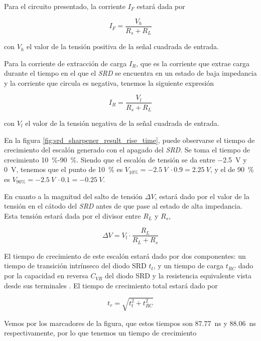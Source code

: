 Para el circuito presentado, la corriente $I_F$ estará dada por

\begin{equation}
    I_{F} = \frac{V_h}{R_s+R_L}
\end{equation}

con $V_h$ el valor de la tensión positiva de la señal cuadrada de entrada.

Para la corriente de extracción de carga $I_R$, que es la corriente que extrae
carga durante el tiempo en el que el \textit{SRD} se encuentra en un estado de
baja impedancia y la corriente que circula es negativa, tenemos la siguiente
expresión

\begin{equation}
    I_{R} = \frac{V_l}{R_s+R_L}
\end{equation}

con $V_l$ el valor de la tensión negativa de la señal cuadrada de entrada.

En la figura \ref{fig:srd_sharpener_result_rise_time}, puede observarse el
tiempo de crecimiento del escalón generado con el apagado del \textit{SRD}. Se
toma el tiempo de crecimiento \qty{10}{\percent}-\qty{90}{\percent}. Siendo que
el escalón de tensión se da entre \qty{-2.5}{\volt} y \qty{0}{\volt}, tenemos
que el punto de \qty{10}{\percent} es $V_{10\%} = -2.5 \ V \ \cdot 0.9 =  2.25 \
V$, y el de \qty{90}{\percent} es $V_{90\%} = -2.5 \ V \ \cdot 0.1 =  -0.25 \
V$.

En cuanto a la magnitud del salto de tensión $\Delta V$, estará dado por el
valor de la tensión en el cátodo del \textit{SRD} antes de que pase al estado de
alta impedancia. Esta tensión estará dada por el divisor entre $R_L$ y $R_s$,

\begin{equation}
    \Delta V = V_l \cdot \frac{R_L}{R_L+R_s}
\end{equation}

El tiempo de crecimiento de este escalón estará dado por dos componentes: un
tiempo de transición intrínseco del diodo SRD $t_t$, y un tiempo de carga $t_{RC}$  dado por la
capacidad en reversa $C_{VR}$ del diodo SRD y la resistencia equivalente vista desde sus terminales \cite{an918}. El tiempo de crecimiento total estará dado por

\begin{equation}
    t_r = \sqrt{t_t^2+t_{RC}^2}
\end{equation}

Vemos por los marcadores de la figura, que estos tiempos son
\qty{87.77}{\nano\second} y \qty{88.06}{\nano\second} respectivamente, por lo
que tenemos un tiempo de crecimiento

